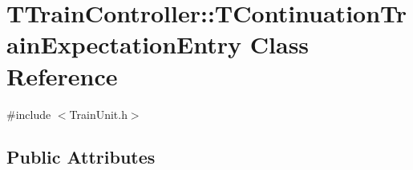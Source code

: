 \hypertarget{class_t_train_controller_1_1_t_continuation_train_expectation_entry}{}\section{T\+Train\+Controller\+:\+:T\+Continuation\+Train\+Expectation\+Entry Class Reference}
\label{class_t_train_controller_1_1_t_continuation_train_expectation_entry}


{\ttfamily \#include $<$Train\+Unit.\+h$>$}

\subsection*{Public Attributes}
